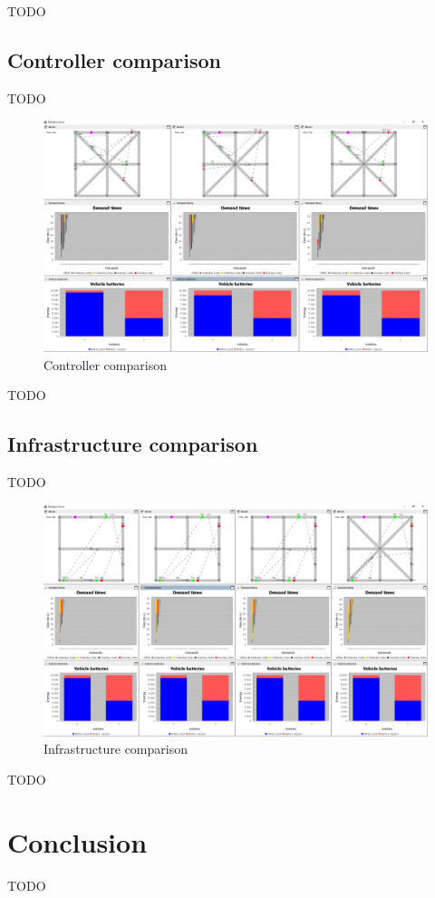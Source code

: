 \documentclass[11pt,twocolumn]{article}
\begin{document}
TODO

\subsection{Controller comparison}
\label{sec:controller-comparison}

TODO

\begin{figure}[htbp]
    \includegraphics[width=\columnwidth]{../../screenshots/controller-comparison.png}
    \caption{Controller comparison}
    \label{fig:controller-comparison}
\end{figure}

TODO

\subsection{Infrastructure comparison}
\label{sec:infrastructure-comparison}

TODO

\begin{figure}[htbp]
    \includegraphics[width=\columnwidth]{../../screenshots/infrastructure-comparison.png}
    \caption{Infrastructure comparison}
    \label{fig:infratructure-comparison}
\end{figure}

TODO

\section{Conclusion}
\label{sec:conclusion}

TODO



\end{document}
